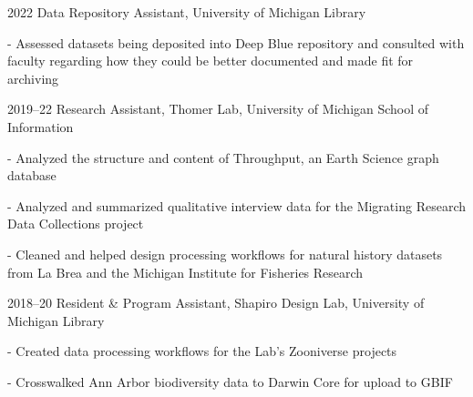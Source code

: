 \documentclass[12pt,letterpaper]{report}
\newcommand{\listitemspace}{0.25em}
\renewenvironment{itemize}
{\begin{list}{}{\setlength{\leftmargin}{0em}
            \setlength{\parskip}{0em}
            \setlength{\itemsep}{\listitemspace}
            \setlength{\parsep}{\listitemspace}}}
{\end{list}}
\begin{document}
\begin{tablist}

	\item[2022] \tab Data Repository Assistant, University of Michigan Library

	\begin{itemize} \begin{footnotesize}

		\item - Assessed datasets being deposited into Deep Blue repository and consulted with faculty regarding how they could be better documented and made fit for archiving

	\end{footnotesize} \end{itemize}
    
	\item[2019--22] \tab Research Assistant, Thomer Lab, University of Michigan School of Information

	\begin{itemize} \begin{footnotesize}

		\item - Analyzed the structure and content of Throughput, an Earth Science graph database
		
		\item - Analyzed and summarized qualitative interview data for the Migrating Research Data Collections project

		\item - Cleaned and helped design processing workflows for natural history datasets from La Brea and the Michigan Institute for Fisheries Research

	\end{footnotesize} \end{itemize}
        
	\item[2018--20] \tab Resident \& Program Assistant, Shapiro Design Lab, University of Michigan Library

	\begin{itemize} \begin{footnotesize}

		\item - Created data processing workflows for the Lab’s Zooniverse projects 

		\item - Crosswalked Ann Arbor biodiversity data to Darwin Core for upload to GBIF

	\end{footnotesize} \end{itemize}


\end{tablist}
\end{document}
